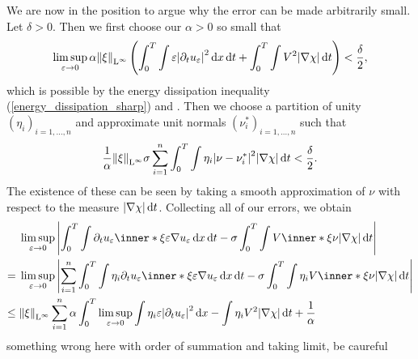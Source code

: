 We are now in the position to argue why the error can be made arbitrarily small. 
Let $ \delta > 0 $. Then we first choose our $ \alpha > 0 $ so small that 
\begin{equation*}
	\limsup_{ \varepsilon \to 0 }
	\alpha \norm{ \xi }_{ \operatorname{L}^{ \infty } }
	\left(
		\int_{ 0 }^{ T }
			\int
				\varepsilon 
				\abs{ \partial_{  t } u_{ \varepsilon } }^{ 2 }
			\dd{ x }
		\dd{ t }
		+
		\int_{ 0 }^{ T }
			\int
				V^{ 2 }
			\abs{ \nabla \chi }
		\dd{ t }
	\right)
	<
	\frac{ \delta }{ 2 },
\end{equation*}
which is possible by the energy dissipation inequality (\ref{energy_dissipation_sharp}) and .
Then we choose a partition of unity $ \left( \eta_{ i } \right)_{ i = 1 , \dotsc , n } $ and approximate unit normals $ \left( \nu^{ \ast }_{ i }\right)_{i = 1 , \dotsc, n } $ such that
\begin{equation*}
	\frac{ 1 }{ \alpha }
	\norm{ \xi }_{ \operatorname{L}^{ \infty } }
	\sigma
	\sum_{ i = 1 }^{ n }
		\int_{ 0 }^{ T }
			\int
			 	\eta_{ i }
			 	\abs{ \nu - \nu_{ i }^{ \ast } }^{ 2 }
			 \abs{ \nabla \chi }
		\dd{ t }
	<
	\frac{ \delta }{2 }.
\end{equation*}
The existence of these can be seen by taking a smooth approximation of $ \nu $ with respect to the measure $ \abs{ \nabla \chi } \dd{ t } $.
Collecting all of our errors, we obtain
\begin{align*}
	& \limsup_{ \varepsilon \to 0 }
		\abs{
		\int_{ 0 }^{ T }
			\int
				\partial_{  t } u_{ \varepsilon }
				\inner*{ \xi }{ \varepsilon \nabla u_{ \varepsilon } }
			\dd{ x }
		\dd{ t }
		-
		\sigma
		\int_{ 0 }^{ T }
			\int
				V \inner*{ \xi }{ \nu }
			\abs{ \nabla \chi }
		\dd{ t }
		}
	\\
	= {} &
	\limsup_{ \varepsilon \to 0 }
	\abs{
		\sum_{ i = 1 }^{ n }
		\int_{ 0 }^{ T }
			\int
			\eta_{ i }
			\partial_{  t } u_{ \varepsilon }
			\inner*{ \xi }{ \varepsilon \nabla u_{ \varepsilon } }
			\dd{ x }
		\dd{ t }
		-
		\sigma
		\int_{ 0 }^{ T }
			\int
			\eta_{ i }
			V \inner*{ \xi }{ \nu }
			\abs{ \nabla \chi }
		\dd{ t }
	}
	\\
	\leq {} & 
	\norm{ \xi }_{ \lp^{ \infty } }
	\sum_{ i = 1 }^{ n } 
		\alpha \int_{ 0 }^{ T }
			\limsup_{ \varepsilon \to 0 }
			\int
				\eta_{ i }
				\varepsilon
				\abs{ \partial_{  t } u_{ \varepsilon } }^{ 2 }
			\dd{ x }
			-
			\int
			 	\eta_{ i }
			 	V^{ 2 }
			 \abs{ \nabla \chi }
		\dd{ t }
		+
		\frac{ 1 }{ \alpha }
\end{align*}
something wrong here with order of summation and taking limit, be caureful